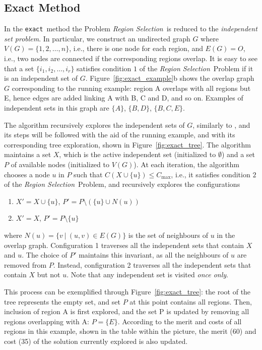 \documentclass[]{usiinfthesis}
\newcommand{\exact}{\texttt{exact}}
\newcommand{\rsprobname}{\emph{Region Selection}}
\begin{document}
\subsection{Exact Method}
\label{sec:algo-exact}

In the \exact\ method the Problem \rsprobname\ is reduced to the
\emph{independent set problem}. In particular, we construct an
undirected graph $G$ where $V(G) = \{ 1, 2, \ldots, n \}$, i.e., there
is one node for each region, and $E(G) = O$, i.e., two nodes are
connected if the corresponding regions overlap. It is easy to see that
a set $\{ i_1, i_2, \ldots, i_r \}$ satisfies condition $1$ of the
\rsprobname\ Problem if it is an independent set of $G$.
Figure~\ref{fig:exact_example}b shows the overlap graph $G$
corresponding to the running example: region A overlaps with all
regions but E, hence edges are added linking A with B, C and D, and so
on. Examples of independent sets in this graph are $\{A\}$, $\{B,D\}$,
$\{B,C,E\}$.\par

The algorithm recursively explores the independent sets of $G$,
similarly to %
\cite{BronKerbosch73}, and
its steps will be followed with the aid of the running example, and
with its corresponding tree exploration, shown in
Figure~\ref{fig:exact_tree}. The algorithm maintains a set $X$, which
is the active independent set (initialized to $\emptyset$) and a set
$P$ of available nodes (initialized to $V(G)$). At each iteration, the
algorithm chooses a node $u$ in $P$ such that $C(X\cup \{u\})\le
C_{\max}$, i.e., it satisfies condition $2$ of the \rsprobname\ Problem,
and recursively explores the configurations
\begin{enumerate}
\item $X' = X\cup \{u\}$, $P' = P\setminus (\{u\}\cup N(u))$
\item $X' = X$, $P' = P\setminus \{u\}$
\end{enumerate}

where $N(u) = \{ v\ |\ (u,v)\in E(G) \}$ is the set of neighbours of
$u$ in the overlap graph.
Configuration 1 traverses all the independent sets that contain $X$
and $u$. The choice of $P'$ maintains this invariant, as all the
neighbours of $u$ are removed from $P$. Instead, configuration 2
traverses all the independent sets that contain $X$ but not $u$. Note
that any independent set is visited \emph{once only}.

This process can be exemplified through Figure~\ref{fig:exact_tree}:
the root of the tree represents the empty set, and set $P$ at this
point contains all regions. Then, inclusion of region A is first
explored, and the set P is updated by removing all regions overlapping
with A: $P = \{E\}$. According to the merit and costs of all regions
in this example, shown in the table within the picture, the merit (60)
and cost (35) of the solution currently explored is also updated.
\end{document}
